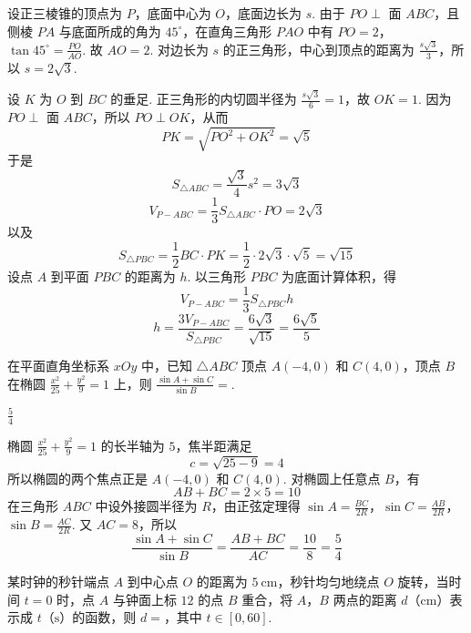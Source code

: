 \begin{solution}
设正三棱锥的顶点为 \(P\)，底面中心为 \(O\)，底面边长为 \(s\). 由于 \(PO\perp\) 面 \(ABC\)，且侧棱 \(PA\) 与底面所成的角为 \(45^{\circ}\)，在直角三角形 \(PAO\) 中有 \(PO=2\)，\(\tan45^{\circ}=\frac{PO}{AO}\).
故 \(AO=2\). 对边长为 \(s\) 的正三角形，中心到顶点的距离为 \(\frac{s\sqrt{3}}{3}\)，所以 \(s=2\sqrt{3}\).

设 \(K\) 为 \(O\) 到 \(BC\) 的垂足. 正三角形的内切圆半径为 \(\frac{s\sqrt{3}}{6}=1\)，故 \(OK=1\). 因为 \(PO\perp\) 面 \(ABC\)，所以 \(PO\perp OK\)，从而
\[
PK=\sqrt{PO^{2}+OK^{2}}=\sqrt{5}
\]
于是
\[
S_{\triangle ABC}=\frac{\sqrt{3}}{4}s^{2}=3\sqrt{3}
\]
\[
V_{P-ABC}=\frac{1}{3}S_{\triangle ABC}\cdot PO=2\sqrt{3}
\]
以及
\[
S_{\triangle PBC}=\frac{1}{2}BC\cdot PK
=\frac{1}{2}\cdot2\sqrt{3}\cdot\sqrt{5}=\sqrt{15}
\]
设点 \(A\) 到平面 \(PBC\) 的距离为 \(h\). 以三角形 \(PBC\) 为底面计算体积，得
\[
V_{P-ABC}=\frac{1}{3}S_{\triangle PBC}h
\]
\[
h=\frac{3V_{P-ABC}}{S_{\triangle PBC}}
=\frac{6\sqrt{3}}{\sqrt{15}}=\frac{6\sqrt{5}}{5}
\]
\end{solution}

\begin{problem}
在平面直角坐标系 \(xOy\) 中，已知 \(\triangle ABC\) 顶点 \(A(-4, 0)\) 和 \(C(4, 0)\)，顶点 \(B\) 在椭圆 \(\frac{x^{2}}{25} + \frac{y^{2}}{9} = 1\) 上，则 \(\frac{\sin A + \sin C}{\sin B} = \)\fillinblank{}.
\end{problem}

\begin{answer}
\(\frac{5}{4}\)
\end{answer}

\begin{solution}
椭圆 \(\frac{x^{2}}{25}+\frac{y^{2}}{9}=1\) 的长半轴为 \(5\)，焦半距满足
\[
c=\sqrt{25-9}=4
\]
所以椭圆的两个焦点正是 \(A(-4,0)\) 和 \(C(4,0)\). 对椭圆上任意点 \(B\)，有
\[
AB+BC=2\times5=10
\]
在三角形 \(ABC\) 中设外接圆半径为 \(R\)，由正弦定理得 \(\sin A=\frac{BC}{2R}\)，\(\sin C=\frac{AB}{2R}\)，\(\sin B=\frac{AC}{2R}\).
又 \(AC=8\)，所以
\[
\frac{\sin A+\sin C}{\sin B}
=\frac{AB+BC}{AC}
=\frac{10}{8}=\frac{5}{4}
\]
\end{solution}

\begin{problem}
某时钟的秒针端点 \(A\) 到中心点 \(O\) 的距离为 \(5 \mathrm{~cm}\)，秒针均匀地绕点 \(O\) 旋转，当时间 \(t = 0\) 时，点 \(A\) 与钟面上标 \(12\) 的点 \(B\) 重合，将 \(A\)，\(B\) 两点的距离 \(d\)（\(\mathrm{cm}\)）表示成 \(t\)（\(\mathrm{s}\)）的函数，则 \(d = \)\fillinblank{}，其中 \(t\in[0,60]\).
\end{problem}

